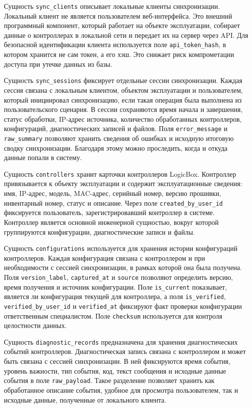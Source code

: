 Сущность \texttt{sync\_clients} описывает локальные клиенты синхронизации. Локальный клиент не является пользователем веб-интерфейса. Это внешний программный компонент, который работает на объекте эксплуатации, собирает данные о контроллерах в локальной сети и передает их на сервер через API. Для безопасной идентификации клиента используется поле \texttt{api\_token\_hash}, в котором хранится не сам токен, а его хэш. Это снижает риск компрометации доступа при утечке данных из базы.

Сущность \texttt{sync\_sessions} фиксирует отдельные сессии синхронизации. Каждая сессия связана с локальным клиентом, объектом эксплуатации и пользователем, который инициировал синхронизацию, если такая операция была выполнена из пользовательского сценария. В сессии сохраняются время начала и завершения, статус обработки, IP-адрес источника, количество обработанных контроллеров, конфигураций, диагностических записей и файлов. Поля \texttt{error\_message} и \texttt{raw\_summary} позволяют хранить сведения об ошибках и исходную итоговую сводку синхронизации. Благодаря этому можно проследить, когда и откуда данные попали в систему.

Сущность \texttt{controllers} хранит карточки контроллеров LogicBox. Контроллер привязывается к объекту эксплуатации и содержит эксплуатационные сведения: имя, IP-адрес, модель, MAC-адрес, серийный номер, версию прошивки, инвентарный номер, статус и описание. Через поле \texttt{created\_by\_user\_id} фиксируется пользователь, зарегистрировавший контроллер в системе. Контроллер является основной инженерной сущностью, вокруг которой группируются конфигурации, диагностические записи и файлы.

Сущность \texttt{configurations} используется для хранения истории конфигураций контроллеров. Каждая конфигурация связана с контроллером и при необходимости с сессией синхронизации, в рамках которой она была получена. Поля \texttt{version\_label}, \texttt{captured\_at} и \texttt{source} позволяют определить версию, время получения и источник конфигурации. Поле \texttt{is\_current} показывает, является ли конфигурация текущей для контроллера, а поля \texttt{is\_verified}, \texttt{verified\_by\_user\_id} и \texttt{verified\_at} фиксируют факт проверки конфигурации ответственным специалистом. Поле \texttt{checksum} используется для контроля целостности данных.

Сущность \texttt{diagnostic\_records} предназначена для хранения диагностических событий контроллеров. Диагностическая запись связана с контроллером и может быть связана с сессией синхронизации. В ней фиксируются время события, уровень важности, тип события, код, текст сообщения и исходные данные события в поле \texttt{raw\_payload}. Такое разделение позволяет хранить как обработанное описание события, удобное для просмотра пользователем, так и исходные данные, полученные от локального клиента.

